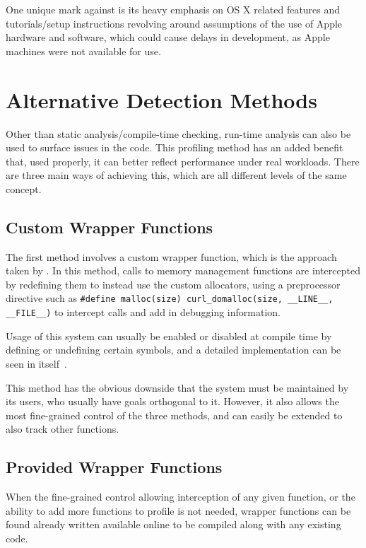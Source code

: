 One unique mark against  is its heavy emphasis on OS X related features and tutorials/setup instructions revolving around assumptions of the use of Apple hardware and software, which could cause delays in development, as Apple machines were not available for use.

\section{Alternative Detection Methods}

Other than static analysis/compile-time checking, run-time analysis can also be used to surface issues in the code. This profiling method has an added benefit that, used properly, it can better reflect performance under real workloads. There are three main ways of achieving this, which are all different levels of the same concept.

\subsection{Custom Wrapper Functions}

The first method involves a custom wrapper function, which is the approach taken by . In this method, calls to memory management functions are intercepted by redefining them to instead use the custom allocators, using a preprocessor directive such as \texttt{\#define malloc(size) curl\_domalloc(size, \_\_LINE\_\_, \_\_FILE\_\_)} to intercept calls and add in debugging information.

Usage of this system can usually be enabled or disabled at compile time by defining or undefining certain symbols, and a detailed implementation can be seen in  itself~\cite{curlallocator}.

This method has the obvious downside that the system must be maintained by its users, who usually have goals orthogonal to it. However, it also allows the most fine-grained control of the three methods, and can easily be extended to also track other functions.

\subsection{Provided Wrapper Functions}

When the fine-grained control allowing interception of any given function, or the ability to add more functions to profile is not needed, wrapper functions can be found already written available online to be compiled along with any existing code.

